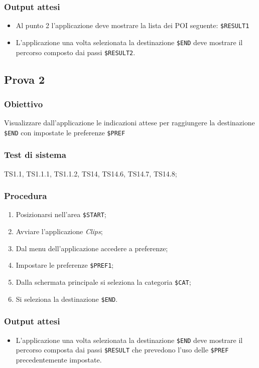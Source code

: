 \documentclass[../SperimentazioniPratiche.tex]{subfiles}
\begin{document}
	\subsubsection{Output attesi}
		\begin{itemize}
		\item Al punto 2 l'applicazione deve mostrare la lista dei POI seguente:  \verb|$RESULT1|
		\item L'applicazione una volta selezionata la destinazione  \verb|$END| deve mostrare il percorso composto dai passi  \verb|$RESULT2|.
		\end{itemize}
		
	
\newpage		
\subsection{Prova 2} %
\label{subsec:Prova2}
	
	\subsubsection{Obiettivo}
		Visualizzare dall'applicazione le indicazioni attese per raggiungere la destinazione  \verb|$END| con impostate le preferenze  \verb|$PREF|
		
	\subsubsection{Test di sistema}
		TS1.1, TS1.1.1, TS1.1.2,
		TS14, TS14.6, TS14.7, TS14.8;
		
		
	\subsubsection{Procedura}
		\begin{enumerate}
		\item Posizionarsi nell'area \verb|$START|;
		\item Avviare l'applicazione \textit{Clips};
		\item Dal menu dell'applicazione accedere a preferenze;
		\item Impostare le preferenze  \verb|$PREF1|;
		\item Dalla schermata principale si seleziona la categoria  \verb|$CAT|;
		\item Si seleziona la destinazione  \verb|$END|.
		\end{enumerate}
		
	\subsubsection{Output attesi}
		\begin{itemize}
		\item L'applicazione una volta selezionata la destinazione  \verb|$END| deve mostrare il percorso composta dai passi  \verb|$RESULT| che prevedono l'uso delle \verb|$PREF| precedentemente impostate.
		\end{itemize}
		
\end{document}
